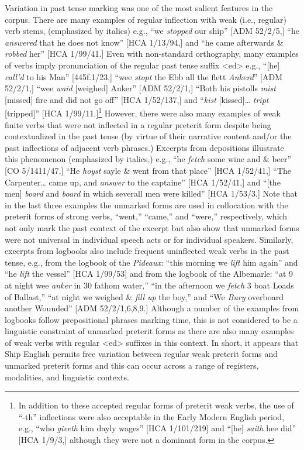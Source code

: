   Variation in past tense marking was one of the most salient features in the corpus. There are many examples of regular inflection with weak (i.e., regular) verb stems, (emphasized by italics) e.g., “we \textit{stopped} our ship” [ADM 52/2/5,] “he \textit{answered} that he does not know” [HCA 1/13/94,] and “he came afterwards \&  \textit{robbed} her” [HCA 1/99/41.] Even with non-standard orthography, many examples of verbs imply pronunciation of the regular past tense suffix <ed> e.g., “[he] \textit{call’d} to his Man” [445f.1/23,] “wee \textit{stopt} the Ebb all the flett \textit{Ankerd}” [ADM 52/2/1,] “wee \textit{waid} [weighed] Anker” [ADM 52/2/1,] “Both his pistolls \textit{mist} [missed] fire and did not go off” [HCA 1/52/137,] and “\textit{kist} [kissed]… \textit{tript} [tripped]” [HCA 1/99/11.]\footnote{In addition to these accepted regular forms of preterit weak verbs, the use of “-th” inflections were also acceptable in the Early Modern English period, e.g., “who \textit{giveth} him dayly wages” [HCA 1/101/219] and “[he] \textit{saith} hee did” [HCA 1/9/3,] although they were not a dominant form in the corpus.} However, there were also many examples of weak finite verbs that were not inflected in a regular preterit form despite being contextualized in the past tense (by virtue of their narrative content and/or the past inflections of adjacent verb phrases.) Excerpts from depositions illustrate this phenomenon (emphasized by italics,) e.g., “he \textit{fetch} some wine and \& beer” [CO 5/1411/47,] “He \textit{hoyst} sayle \& went from that place” [HCA 1/52/41,] “The Carpenter… came up, and \textit{answer} to the captaine” [HCA 1/52/41,] and “[the men] \textit{board} and \textit{board} in which severall men were killed” [HCA 1/53/3.] Note that in the last three examples the unmarked forms are used in collocation with the preterit forms of strong verbs, “went,” “came,” and “were,” respectively, which not only mark the past context of the excerpt but also show that unmarked forms were not universal in individual speech acts or for individual speakers. Similarly, excerpts from logbooks also include frequent uninflected weak verbs in the past tense, e.g., from the logbook of the \textit{Pideaux:} “this morning we \textit{lift} him again” and “he \textit{lift} the vessel” [HCA 1/99/53] and from the logbook of the Albemarle: “at 9 at night wee \textit{anker} in 30 fathom water,” “in the afternoon we \textit{fetch} 3 boat Loads of Ballast,” “at night we weighed \& \textit{fill} \textit{up} the boy,” and “We \textit{Bury} overboard another Wounded” [ADM 52/2/1,6,8,9.] Although a number of the examples from logbooks follow prepositional phrases marking time, this is not considered to be a linguistic constraint of unmarked preterit forms as there are also many examples of weak verbs with regular <ed> suffixes in this context. In short, it appears that Ship English permits free variation between regular weak preterit forms and unmarked preterit forms and this can occur across a range of registers, modalities, and linguistic contexts. 

